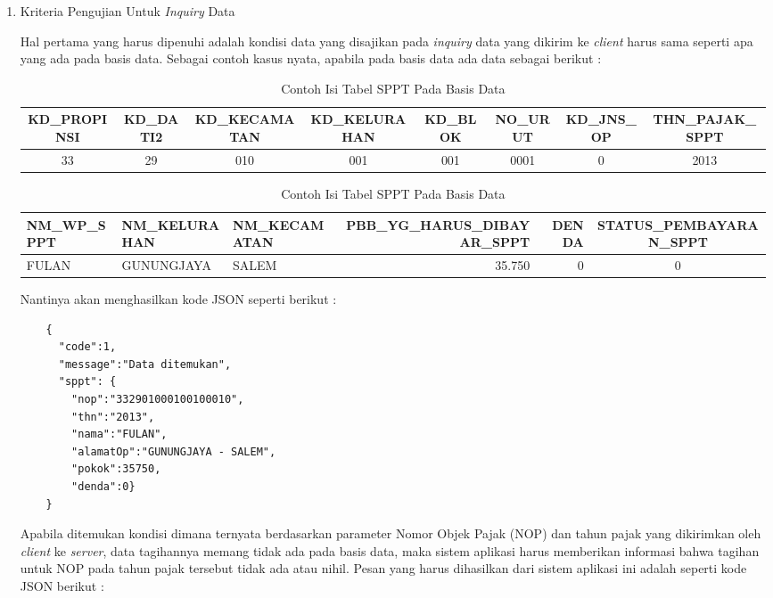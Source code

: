 \documentclass[pdftex,12pt, oneside]{article}
\begin{document}
\begin{enumerate}[1.]
  \item Kriteria Pengujian Untuk \textit{Inquiry} Data
  
  Hal pertama yang harus dipenuhi adalah kondisi data yang disajikan pada \textit{inquiry} data yang dikirim ke \textit{client} harus sama seperti apa yang ada pada basis data. Sebagai contoh kasus nyata, apabila pada basis data ada data sebagai berikut :
  \begin{table}[H]
    \resizebox{8cm}{!}
      {
        \begin{minipage}{1\textwidth}
        \begin{tabular}{|c|c|c|c|c|c|c|c|}
          \hline
          \textbf{KD\_PROPINSI} & \textbf{KD\_DATI2} & \textbf{KD\_KECAMATAN} & \textbf{KD\_KELURAHAN} & \textbf{KD\_BLOK} & \textbf{NO\_URUT} & \textbf{KD\_JNS\_OP} & \textbf{THN\_PAJAK\_SPPT} \\
          \hline \hline
          33 & 29 & 010 & 001 & 001 & 0001 & 0 & 2013 \\
          \hline
        \end{tabular}
  
        \begin{tabular}{|l|l|l|r|r|c|}
          \hline
      	  \textbf{NM\_WP\_SPPT} & \textbf{NM\_KELURAHAN} & \textbf{NM\_KECAMATAN} & \textbf{PBB\_YG\_HARUS\_DIBAYAR\_SPPT} & \textbf{DENDA} & \textbf{STATUS\_PEMBAYARAN\_SPPT} \\
   	      \hline \hline
       	  FULAN & GUNUNGJAYA & SALEM & 35.750 & 0 & 0 \\
       	  \hline
        \end{tabular}
        \centering
      \end{minipage}
    }
    \caption{Contoh Isi Tabel SPPT Pada Basis Data}
  \end{table}
  
  Nantinya akan menghasilkan kode JSON seperti berikut :
  
  \begin{lstlisting}
    {
      "code":1,
      "message":"Data ditemukan",
      "sppt": {
        "nop":"332901000100100010",
        "thn":"2013",
        "nama":"FULAN",
        "alamatOp":"GUNUNGJAYA - SALEM",
        "pokok":35750,
        "denda":0}
    }
  \end{lstlisting}
    
  Apabila ditemukan kondisi dimana ternyata berdasarkan parameter Nomor Objek Pajak (NOP) dan tahun pajak yang dikirimkan oleh \textit{client} ke \textit{server}, data tagihannya memang tidak ada pada basis data, maka sistem aplikasi harus memberikan informasi bahwa tagihan untuk NOP pada tahun pajak tersebut tidak ada atau nihil. Pesan yang harus dihasilkan dari sistem aplikasi ini adalah seperti kode JSON berikut :
  

\end{enumerate}
\end{document}
